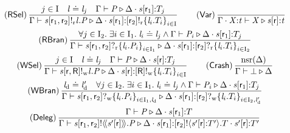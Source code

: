 \begin{figure}[tp]
\[\begin{array}{c}
		\left( \textsf{RSel} \right) \dfrac{j \in \indexSet \quad \Label \compL \Label_j \quad \Gamma \vdash \PT \triangleright \Delta \compS \Typed{\AT{\Chan}{\Role_1}}{\LT_j}}{\Gamma \vdash \PSelR{\Chan}{\Role_1}{\Role_2}{\Label}{\PT} \triangleright \Delta \compS \Typed{\AT{\Chan}{\Role_1}}{\LSelR{\Role_2}{\Set{ \Label_i.\LT_i }_{i \in \indexSet}}}} \hspace{2em}
		\left( \textsf{Var} \right) \dfrac{}{\Gamma \compS \Typed{\ProcV}{\TypeV} \vdash \ProcV \triangleright \Typed{\AT{\Chan}{\Role}}{\TypeV}} \vspace{0.5em}\\
		\left( \textsf{RBran} \right) \dfrac{\forall j \in \indexSet_2\logdot \exists i \in \indexSet_1\logdot \Label_i \compL \Label_j \wedge \Gamma \vdash \PT_i \triangleright \Delta \compS \Typed{\AT{\Chan}{\Role_1}}{\LT_j}}{\Gamma \vdash \PBranR{\Chan}{\Role_1}{\Role_2}{\Set{ \Label_i.\PT_i }_{i \in \indexSet_1}} \triangleright \Delta \compS \Typed{\AT{\Chan}{\Role_1}}{\LBranR{\Role_2}{\Set{ \Label_i.\LT_i }_{i \in \indexSet_2}}}} \vspace{0.5em}\\
		\left( \textsf{WSel} \right) \dfrac{j \in \indexSet \quad \Label \compL \Label_j \quad \Gamma \vdash \PT \triangleright \Delta \compS \Typed{\AT{\Chan}{\Role}}{\LT_j}}{\Gamma \vdash \PSelW{\Chan}{\Role}{\Role[R]}{\Label}{\PT} \triangleright \Delta \compS \Typed{\AT{\Chan}{\Role}}{\LSelW{\Role[R]}{\Set{ \Label_i.\LT_i }_{i \in \indexSet}}}} \hspace{2em}
		\left( \textsf{Crash} \right) \dfrac{\Unreliable{\Delta}}{\Gamma \vdash \PCrash \triangleright \Delta} \vspace{0.5em}\\
		\left( \textsf{WBran} \right) \dfrac{\LabelD \compL \LabelD' \quad \forall j \in \indexSet_2\logdot \exists i \in \indexSet_1\logdot \Label_i \compL \Label_j \wedge \Gamma \vdash \PT_i \triangleright \Delta \compS \Typed{\AT{\Chan}{\Role_1}}{\LT_j}}{\Gamma \vdash \PBranW{\Chan}{\Role_1}{\Role_2}{\Set{ \Label_i.\PT_i }_{i \in \indexSet_1, \LabelD}} \triangleright \Delta \compS \Typed{\AT{\Chan}{\Role_1}}{\LBranW{\Role_2}{\Set{ \Label_i.\LT_i }_{i \in \indexSet_2, \LabelD'}}}} \vspace{0.5em}\\
		\left( \textsf{Deleg} \right) \dfrac{\Gamma \vdash \PT \triangleright \Delta \compS \Typed{\AT{\Chan}{\Role_1}}{\LT}}{\Gamma \vdash \PDelA{\Chan}{\Role_1}{\Role_2}{\AT{\Chan'}{\Role}}{\PT} \triangleright \Delta \compS \Typed{\AT{\Chan}{\Role_1}}{\LDelA{\Role_2}{\Chan'}{\Role}{\LT'}{\LT}} \compS \Typed{\AT{\Chan'}{\Role}}{\LT'}} \vspace{0.5em}\\

\end{array}\]
\end{figure}
